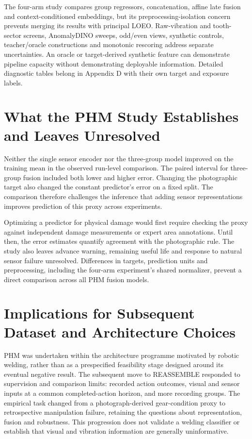 The four-arm study compares group regressors, concatenation, affine late fusion and
context-conditioned embeddings, but its preprocessing-isolation concern prevents merging
its results with principal LOEO. Raw-vibration and tooth-sector screens, AnomalyDINO
sweeps, odd/even views, synthetic controls, teacher/oracle constructions and monotonic
rescoring address separate uncertainties. An oracle or target-derived synthetic feature
can demonstrate pipeline capacity without demonstrating deployable information. Detailed
diagnostic tables belong in Appendix D with their own target and exposure labels.

\section{What the PHM Study Establishes and Leaves Unresolved}
Neither the single sensor encoder nor the three-group model improved on the training
mean in the observed run-level comparison. The paired interval for three-group fusion
included both lower and higher error. Changing the photographic target also changed the
constant predictor's error on a fixed split. The comparison therefore challenges the
inference that adding sensor representations improves prediction of this proxy across
experiments.

Optimizing a predictor for physical damage would first require checking the proxy
against independent damage measurements or expert area annotations. Until then, the
error estimates quantify agreement with the photographic rule. The study also leaves
advance warning, remaining useful life and response to natural sensor failure
unresolved. Differences in targets, prediction units and preprocessing, including the
four-arm experiment's shared normalizer, prevent a direct comparison across all PHM
fusion models.

\section{Implications for Subsequent Dataset and Architecture Choices}
PHM was undertaken within the architecture programme motivated by robotic welding,
rather than as a prespecified feasibility stage designed around its eventual negative
result. The subsequent move to REASSEMBLE responded to supervision and comparison
limits: recorded action outcomes, visual and sensor inputs at a common completed-action
horizon, and more recording groups. The empirical task changed from a photograph-derived
gear-condition proxy to retrospective manipulation failure, retaining the questions
about representation, fusion and robustness. This progression does not validate a
welding classifier or establish that visual and vibration information are generally
uninformative.

